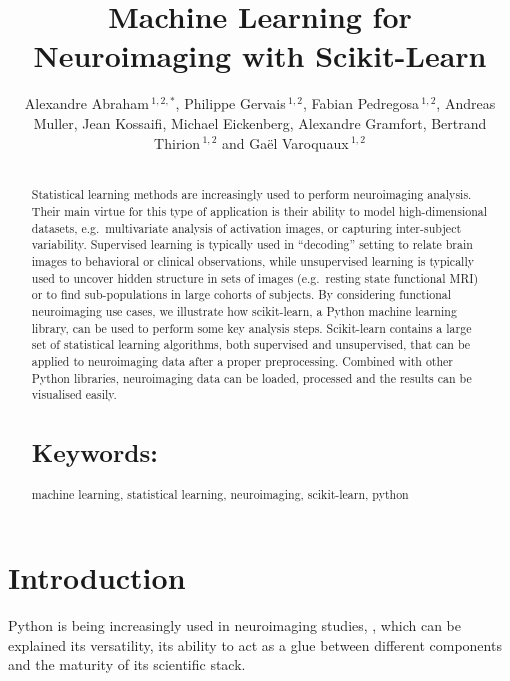 \documentclass{frontiersSCNS} %
\def\firstAuthorLast{Alexandre Abraham {et~al}} %
\def\Authors{Alexandre Abraham\,$^{1,2,*}$, Philippe Gervais\,$^{1,2}$, Fabian
Pedregosa\,$^{1,2}$, Andreas Muller, Jean Kossaifi, Michael Eickenberg, Alexandre Gramfort, Bertrand
Thirion\,$^{1,2}$ and Ga\"el Varoquaux\,$^{1,2}$}
\begin{document}
\onecolumn
{}

\title[Machine Learning for Neuroimaging with Scikit-Learn]{Machine Learning for Neuroimaging with Scikit-Learn}
\author[\firstAuthorLast ]{\Authors}
\address{}
\correspondance{}
\editor{}

\maketitle
\begin{abstract}

\section{}
Statistical learning methods are increasingly used to perform
neuroimaging analysis. Their main virtue for this type of application
is their ability to model high-dimensional datasets, e.g.\ multivariate
analysis of activation images, or capturing inter-subject variability.
Supervised learning is typically used in “decoding” setting to relate
brain images to behavioral or clinical observations, while
unsupervised learning is typically used to uncover hidden structure in
sets of images (e.g.\ resting state functional MRI) or to find
sub-populations in large cohorts of subjects. By considering
functional neuroimaging use cases, we illustrate how scikit-learn,
a Python machine learning library, can be used to perform some key
analysis steps. Scikit-learn contains a large set of statistical
learning algorithms, both supervised and unsupervised, that can be applied
to neuroimaging data after a proper preprocessing. Combined with other
Python libraries, neuroimaging data can be loaded, processed and the results
can be visualised easily.



\tiny
\section{Keywords:} machine learning, statistical learning, neuroimaging, scikit-learn, python
\end{abstract}


\section{Introduction}

Python is being increasingly used in neuroimaging studies, \cite{millman2007analysis, hanke2009pymvpa}, which can be explained its
versatility, its ability to act as a glue between different components and the
maturity of its scientific stack.
\end{document}
